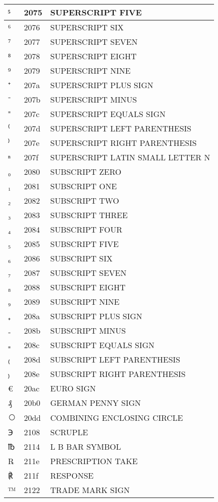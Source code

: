 \documentclass[12pt,letterpaper,openany]{book}
\begin{document}
\begin{center}
\begin{supertabular}{|m{0.25in}|m{0.5in}|m{4in}|}
⁵ & 2075 & SUPERSCRIPT FIVE\\\hline
⁶ & 2076 & SUPERSCRIPT SIX\\\hline
⁷ & 2077 & SUPERSCRIPT SEVEN\\\hline
⁸ & 2078 & SUPERSCRIPT EIGHT\\\hline
⁹ & 2079 & SUPERSCRIPT NINE\\\hline
⁺ & 207a & SUPERSCRIPT PLUS SIGN\\\hline
⁻ & 207b & SUPERSCRIPT MINUS\\\hline
⁼ & 207c & SUPERSCRIPT EQUALS SIGN\\\hline
⁽ & 207d & SUPERSCRIPT LEFT PARENTHESIS\\\hline
⁾ & 207e & SUPERSCRIPT RIGHT PARENTHESIS\\\hline
ⁿ & 207f & SUPERSCRIPT LATIN SMALL LETTER N\\\hline
₀ & 2080 & SUBSCRIPT ZERO\\\hline
₁ & 2081 & SUBSCRIPT ONE\\\hline
₂ & 2082 & SUBSCRIPT TWO\\\hline
₃ & 2083 & SUBSCRIPT THREE\\\hline
₄ & 2084 & SUBSCRIPT FOUR\\\hline
₅ & 2085 & SUBSCRIPT FIVE\\\hline
₆ & 2086 & SUBSCRIPT SIX\\\hline
₇ & 2087 & SUBSCRIPT SEVEN\\\hline
₈ & 2088 & SUBSCRIPT EIGHT\\\hline
₉ & 2089 & SUBSCRIPT NINE\\\hline
₊ & 208a & SUBSCRIPT PLUS SIGN\\\hline
₋ & 208b & SUBSCRIPT MINUS\\\hline
₌ & 208c & SUBSCRIPT EQUALS SIGN\\\hline
₍ & 208d & SUBSCRIPT LEFT PARENTHESIS\\\hline
₎ & 208e & SUBSCRIPT RIGHT PARENTHESIS\\\hline
€ & 20ac & EURO SIGN\\\hline
₰ & 20b0 & GERMAN PENNY SIGN\\\hline
⃝ & 20dd & COMBINING ENCLOSING CIRCLE\\\hline
℈ & 2108 & SCRUPLE\\\hline
℔ & 2114 & L B BAR SYMBOL\\\hline
℞ & 211e & PRESCRIPTION TAKE\\\hline
℟ & 211f & RESPONSE\\\hline
™ & 2122 & TRADE MARK SIGN\\\hline

\end{supertabular}
\end{center}
\end{document}
